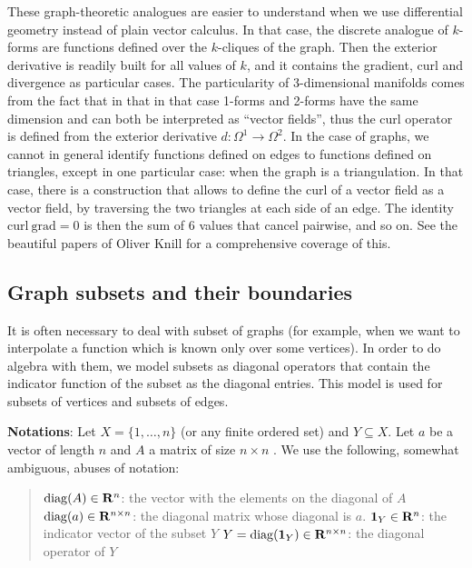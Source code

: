 These graph-theoretic analogues are easier to understand when we use
differential geometry instead of plain vector calculus.  In that case, the
discrete analogue of $k$-forms are functions defined over the $k$-cliques of the
graph.  Then the exterior derivative is readily built for all values of $k$,
and it contains the gradient, curl and divergence as particular cases.
The particularity of 3-dimensional manifolds comes from the fact that in
that in that case 1-forms and 2-forms have
the same dimension and can both be interpreted as ``vector fields'', thus the
curl operator is defined from the exterior derivative
$d:\Omega^1\to\Omega^2$.  In the case of graphs, we cannot in general identify functions
defined on edges to functions defined on triangles, except in one particular
case: when the graph is a triangulation.  In that case, there is a
construction that allows to define the curl of a vector field as a vector
field, by traversing the two triangles at each side of an edge.  The identity
$\mathrm{curl\ grad}=0$ is then the sum of 6 values that cancel pairwise, and
so on.  See the beautiful papers of Oliver Knill for a comprehensive coverage
of this.



\subsection{Graph subsets and their boundaries}


It is often necessary to deal with subset of graphs (for example, when we
want to interpolate a function which is known only over some vertices).
In order to do algebra with them, we model subsets as diagonal operators that
contain the indicator function of the subset as the diagonal entries.  This
model is used for subsets of vertices and subsets of edges.



{\bf Notations}:
Let $X=\{1,\ldots,n\}$ (or any finite ordered set) and $Y\subseteq X$.
Let $a$ be a vector of length $n$ and $A$ a
matrix of size $n\times n$ .  We use the following, somewhat ambiguous,
abuses of notation:

\begin{quotation}
$\mathrm{diag}(A)\in\mathbf{R}^n$:
the vector with the elements on the diagonal of $A$
$\mathrm{diag}(a)\in\mathbf{R}^{n\times n}$:
the diagonal matrix whose diagonal is $a$.
$\mathbf{1}_Y\in\mathbf{R}^{n}$: the indicator vector of the subset $Y$
$Y=\mathrm{diag}(\mathbf{1}_Y)\in\mathbf{R}^{n\times n}$: the diagonal operator of $Y$
\end{quotation}

